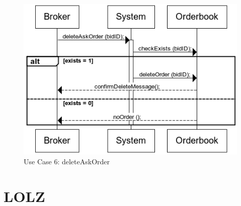 \documentclass[a4paper]{article}
\begin{document}
\begin{figure}
  \caption{Use Case 6: deleteAskOrder}
  \centering
    \includegraphics[width=1\textwidth]{images/deleteAskOrder}
\end{figure}




\section{LOLZ}
\end{document}
